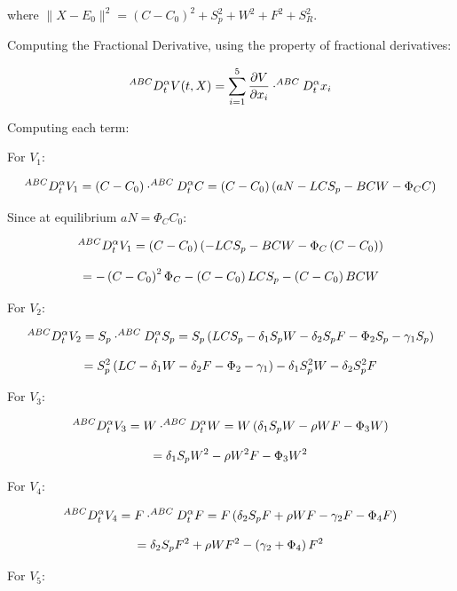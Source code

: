\documentclass[10pt]{NSP1}
\newcommand{\fitwidth}[1]{\resizebox{\ifdim\width>\linewidth\linewidth\else\width\fi}{!}{#1}}
\begin{document}
where \(\parallel X - E_{0} \parallel^{2} = \left( C - C_{0} \right)^{2} + S_{p}^{2} + W^{2} + F^{2} + S_{R}^{2}\).

Computing the Fractional Derivative, using the property of fractional derivatives:

\[
\fitwidth{$\displaystyle ^{ABC}D_{t}^{\alpha}V(t,X) = \sum_{i = 1}^{5}{}\frac{\partial V}{\partial x_{i}} \cdot^{ABC}D_{t}^{\alpha}x_{i}$}
\]

Computing each term:

For \(V_{1}\):

\[
\fitwidth{$\displaystyle ^{ABC}D_{t}^{\alpha}V_{1} = \left( C - C_{0} \right) \cdot^{ABC}D_{t}^{\alpha}C = \left( C - C_{0} \right)\left( aN - LCS_{p} - BCW - \Phi_{C}C \right)$}
\]

Since at equilibrium \(aN = \Phi_{C}C_{0}\):

\[
\fitwidth{$\displaystyle ^{ABC}D_{t}^{\alpha}V_{1} = \left( C - C_{0} \right)\left( - LCS_{p} - BCW - \Phi_{C}\left( C - C_{0} \right) \right)$}
\]

\[
\fitwidth{$\displaystyle = - \left( C - C_{0} \right)^{2}\Phi_{C} - \left( C - C_{0} \right)LCS_{p} - \left( C - C_{0} \right)BCW$}
\]

For \(V_{2}\):

\[
\fitwidth{$\displaystyle ^{ABC}D_{t}^{\alpha}V_{2} = S_{p} \cdot^{ABC}D_{t}^{\alpha}S_{p} = S_{p}\left( LCS_{p} - \delta_{1}S_{p}W - \delta_{2}S_{p}F - \Phi_{2}S_{p} - \gamma_{1}S_{p} \right)$}
\]

\[
\fitwidth{$\displaystyle = S_{p}^{2}\left( LC - \delta_{1}W - \delta_{2}F - \Phi_{2} - \gamma_{1} \right) - \delta_{1}S_{p}^{2}W - \delta_{2}S_{p}^{2}F$}
\]

For \(V_{3}\):

\[
\fitwidth{$\displaystyle ^{ABC}D_{t}^{\alpha}V_{3} = W \cdot^{ABC}D_{t}^{\alpha}W = W\left( \delta_{1}S_{p}W - \rho WF - \Phi_{3}W \right)$}
\]

\[
\fitwidth{$\displaystyle = \delta_{1}S_{p}W^{2} - \rho W^{2}F - \Phi_{3}W^{2}$}
\]

For \(V_{4}\):

\[
\fitwidth{$\displaystyle ^{ABC}D_{t}^{\alpha}V_{4} = F \cdot^{ABC}D_{t}^{\alpha}F = F\left( \delta_{2}S_{p}F + \rho WF - \gamma_{2}F - \Phi_{4}F \right)$}
\]

\[
\fitwidth{$\displaystyle = \delta_{2}S_{p}F^{2} + \rho WF^{2} - \left( \gamma_{2} + \Phi_{4} \right)F^{2}$}
\]

For \(V_{5}\):
\end{document}
